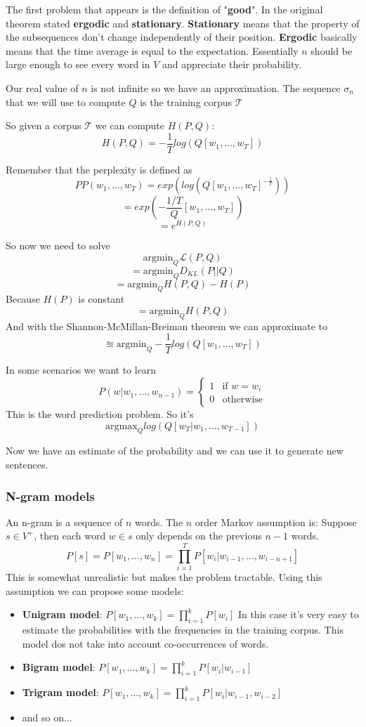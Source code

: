 The first problem that appears is the definition of "\textbf{good}".
In the original theorem stated \textbf{ergodic} and \textbf{stationary}.
\textbf{Stationary} means that the property of the subsequences don't change
independently of their position.
\textbf{Ergodic} basically means that the time average is 
equal to the expectation.
Essentially $n$ should be large enough to see every word in $V$
and appreciate their probability.

Our real value of $n$ is not infinite so we have an approximation.
The sequence $\sigma_n$ that we will use to compute $Q$ is the training corpus $\mathcal{T}$

So given a corpus $\mathcal{T}$ we can compute $H(P,Q)$:
\[
    H(P,Q)=-\frac{1}{T}log(Q[w_1,\dots,w_T])
\]

Remember that the perplexity is defined as
\[
    PP(w_1,\dots,w_T)=exp(log(Q[w_1,\dots,w_T]^{-\frac{1}{T}}))
\]
\[
    =exp(-\frac{1/T}Q[w_1,\dots,w_T])
\]
\[
    =e^{H(P,Q)}
\]

So now we need to solve
\[
    \text{argmin}_Q\mathcal{L}(P,Q)
\]
\[
    =\text{argmin}_Q D_{KL}(P||Q)
\]
\[
    =\text{argmin}_Q H(P,Q)-H(P)
\]
Because $H(P)$ is constant
\[
    =\text{argmin}_Q H(P,Q)
\]
And with the Shannon-McMillan-Breiman theorem we can approximate
to
\[
    \approxeq \text{argmin}_Q -\frac{1}{T}log(Q[w_1,\dots,w_T])
\]

In some scenarios we want to learn 
\[
    P(w|w_1,\dots,w_{n-1})=\begin{cases}
        1 & \text{if } w=w_i\\
        0 & \text{otherwise}
    \end{cases}
\]
This is the word prediction problem.
So it's
\[
    \text{argmax}_Q log(Q[w_T|w_1,\dots,w_{T-1}])
\]

Now we have an estimate of the probability and we can use it
to generate new sentences.

\subsubsection{N-gram models}

An n-gram is a sequence of $n$ words.
The $n$ order Markov assumption is:
Suppose $s\in V^+$, then each word $w\in s$ only depends on the previous $n-1$ words.
\[
    P[s]=P[w_1,\dots,w_n]=\prod_{i=1}^{T}P[w_i|w_{i-1},\dots,w_{i-n+1}]
\]
This is somewhat unrealistic but makes the problem tractable.
Using this assumption we can propose some models:
\begin{itemize}
    \item \textbf{Unigram model}: $P[w_1,\dots,w_k]=\prod_{i=1}^{k}P[w_i]$
    In this case it's very easy to estimate the probabilities with the
    frequencies in the training corpus. This model dos not take into account
    co-occurrences of words.
    \item \textbf{Bigram model}: $P[w_1,\dots,w_k]=\prod_{i=1}^{k}P[w_i|w_{i-1}]$
    \item \textbf{Trigram model}: $P[w_1,\dots,w_k]=\prod_{i=1}^{k}P[w_i|w_{i-1},w_{i-2}]$
    \item and so on...
\end{itemize}


